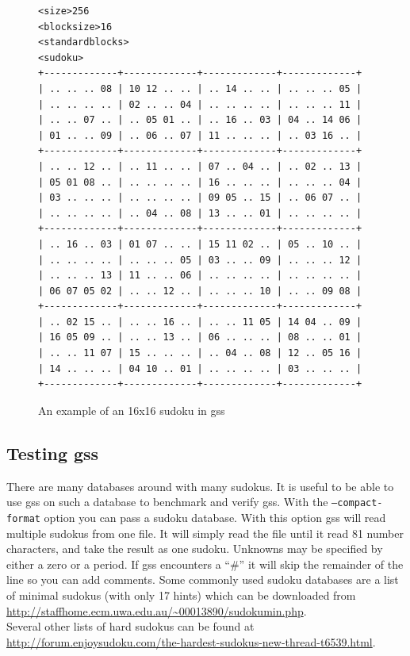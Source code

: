 \documentclass[12pt]{article}
\begin{document}
\begin{figure}
\begin{verbatim}
<size>256
<blocksize>16
<standardblocks>
<sudoku>
+-------------+-------------+-------------+-------------+
| .. .. .. 08 | 10 12 .. .. | .. 14 .. .. | .. .. .. 05 |
| .. .. .. .. | 02 .. .. 04 | .. .. .. .. | .. .. .. 11 |
| .. .. 07 .. | .. 05 01 .. | .. 16 .. 03 | 04 .. 14 06 |
| 01 .. .. 09 | .. 06 .. 07 | 11 .. .. .. | .. 03 16 .. |
+-------------+-------------+-------------+-------------+
| .. .. 12 .. | .. 11 .. .. | 07 .. 04 .. | .. 02 .. 13 |
| 05 01 08 .. | .. .. .. .. | 16 .. .. .. | .. .. .. 04 |
| 03 .. .. .. | .. .. .. .. | 09 05 .. 15 | .. 06 07 .. |
| .. .. .. .. | .. 04 .. 08 | 13 .. .. 01 | .. .. .. .. |
+-------------+-------------+-------------+-------------+
| .. 16 .. 03 | 01 07 .. .. | 15 11 02 .. | 05 .. 10 .. |
| .. .. .. .. | .. .. .. 05 | 03 .. .. 09 | .. .. .. 12 |
| .. .. .. 13 | 11 .. .. 06 | .. .. .. .. | .. .. .. .. |
| 06 07 05 02 | .. .. 12 .. | .. .. .. 10 | .. .. 09 08 |
+-------------+-------------+-------------+-------------+
| .. 02 15 .. | .. .. 16 .. | .. .. 11 05 | 14 04 .. 09 |
| 16 05 09 .. | .. .. 13 .. | 06 .. .. .. | 08 .. .. 01 |
| .. .. 11 07 | 15 .. .. .. | .. 04 .. 08 | 12 .. 05 16 |
| 14 .. .. .. | 04 10 .. 01 | .. .. .. .. | 03 .. .. .. |
+-------------+-------------+-------------+-------------+
\end{verbatim}
\caption{\label{sudoku16}An example of an 16x16 sudoku in gss}
\end{figure}

\subsection{Testing gss}
There are many databases around with many sudokus. It is useful to be able to use gss on such a database to benchmark and verify gss. With the \texttt{--compact-format} option you can pass a sudoku database. With this option gss will read multiple sudokus from one file. It will simply read the file until it read 81 number characters, and take the result as one sudoku. Unknowns may be specified by either a zero or a period. If gss encounters a ``\#'' it will skip the remainder of the line so you can add comments. Some commonly used sudoku databases are a list of minimal sudokus (with only 17 hints) which can be downloaded from \\
\url{http://staffhome.ecm.uwa.edu.au/~00013890/sudokumin.php}.\\
Several other lists of hard sudokus can be found at\\
\url{http://forum.enjoysudoku.com/the-hardest-sudokus-new-thread-t6539.html}.
\end{document}
